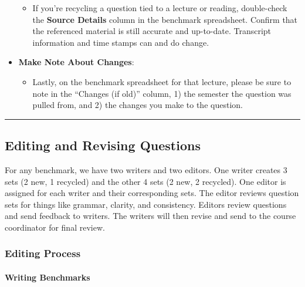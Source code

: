 \documentclass[
]{article}
\providecommand{\tightlist}{%
  \setlength{\itemsep}{0pt}\setlength{\parskip}{0pt}}
\begin{document}
\begin{itemize}
  \begin{itemize}
  \tightlist
  \item
    If you're recycling a question tied to a lecture or reading, double-check the \textbf{Source Details} column in the benchmark spreadsheet. Confirm that the referenced material is still accurate and up-to-date. Transcript information and time stamps can and do change.
  \end{itemize}
\item
  \textbf{Make Note About Changes}:

  \begin{itemize}
  \tightlist
  \item
    Lastly, on the benchmark spreadsheet for that lecture, please be sure to note in the ``Changes (if old)'' column, 1) the semester the question was pulled from, and 2) the changes you make to the question.
  \end{itemize}
\end{itemize}

\begin{center}\rule{0.5\linewidth}{0.5pt}\end{center}

\hypertarget{editing-and-revising-questions}{%
\subsection{Editing and Revising Questions}\label{editing-and-revising-questions}}

For any benchmark, we have two writers and two editors. One writer creates 3 sets (2 new, 1 recycled) and the other 4 sets (2 new, 2 recycled). One editor is assigned for each writer and their corresponding sets. The editor reviews question sets for things like grammar, clarity, and consistency. Editors review questions and send feedback to writers. The writers will then revise and send to the course coordinator for final review.

\hypertarget{editing-process}{%
\subsubsection{Editing Process}\label{editing-process}}

\hypertarget{writing-benchmarks}{%
\paragraph{Writing Benchmarks}\label{writing-benchmarks}}
\end{document}
